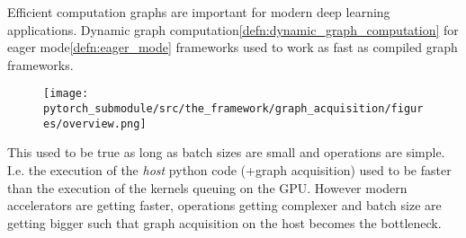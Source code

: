 \begin{sectionbox}\nospacing
        Efficient computation graphs are important for modern deep learning applications.
        Dynamic graph computation\cref{defn:dynamic_graph_computation} for eager mode\cref{defn:eager_mode} frameworks used to work as fast as compiled graph frameworks.
        \begin{figure}[H]
            \centering
            \texttt{[image: pytorch\_submodule/src/the\_framework/graph\_acquisition/figures/overview.png]}
        \end{figure}
        This used to be true as long as batch sizes are small and operations are simple.
        I.e. the execution of the \textit{host} python code (+graph acquisition) used to be faster than the execution of the kernels queuing on the GPU.
        However modern accelerators are getting faster, operations getting complexer and batch size are getting bigger such that graph acquisition on the host becomes the bottleneck.
\end{sectionbox}

